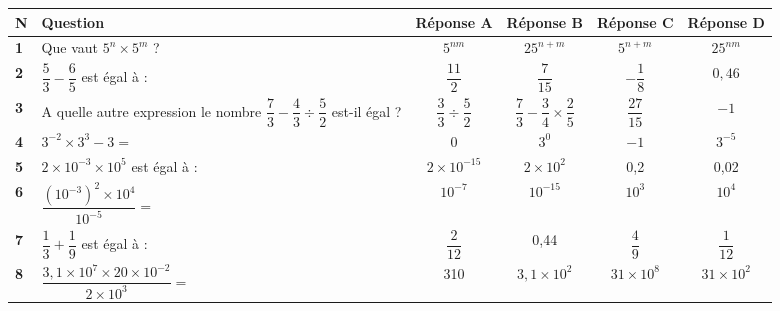 \documentclass[a4paper,11pt]{article}
\begin{document}
\vspace*{0.25cm}

\renewcommand{\arraystretch}
{3.2}

\begin{tabular}{|p{0.75cm}|p{4.5cm}|c|c|c|c|}
\hline 
\textbf{N} & \textbf{Question} & \textbf{Réponse A} & \textbf{Réponse B} & \textbf{Réponse C} & \textbf{Réponse D} \\ 
\hline 
\textbf{1}& Que vaut $5^{n} \times 5^{m}$ ?  & $5^{nm}$ & $25^{n+m}$ & $5^{n+m}$ & $25^{nm}$ \\ 
\hline 
\textbf{2}& $\dfrac{5}{3}-\dfrac{6}{5}$ est égal à : & $\dfrac{11}{2}$ & $\dfrac{7}{15}$  & $-\dfrac{1}{8}$  & $0,46$ \\ 
\hline 
\textbf{3} & A quelle autre expression le nombre $\dfrac{7}{3}-\dfrac{4}{3} \div \dfrac{5}{2}$ est-il égal ? & $\dfrac{3}{3} \div \dfrac{5}{2}$ & $\dfrac{7}{3}-\dfrac{3}{4} \times \dfrac{2}{5}$& $\dfrac{27}{15}$ & $-1$ \\ 
\hline 
\textbf{4} & $3^{-2} \times 3^{3}-3=$ & $0$ & $3^{0}$ & $-1$ & $3^{-5}$ \\ 
\hline 
\textbf{5} & $2 \times 10^{-3} \times 10^{5}$ est égal à : & $2 \times 10^{-15}$& $2 \times 10^{2}$ & 0,2 & 0,02 \\ 
\hline 
\textbf{6} & $\dfrac{(10^{-3})^{2} \times 10^{4}}{10^{-5}}=$ & $10^{-7}$ & $10^{-15}$ & $10^{3}$ & $10^{4}$ \\ 
\hline 
\textbf{7} & $\dfrac{1}{3}+\dfrac{1}{9} $ est égal à : & $\dfrac{2}{12}$ & 0,44& $\dfrac{4}{9}$& $\dfrac{1}{12}$ \\ 
\hline 
\textbf{8} & $\dfrac{3,1 \times 10^{7} \times 20 \times 10^{-2}}{2 \times 10^{3}}=$   & 310 & $3,1 \times 10^{2}$ & $31 \times 10^{8}$ & $31 \times 10^{2}$ \\ 
\hline 
\end{tabular} 
\end{document}

